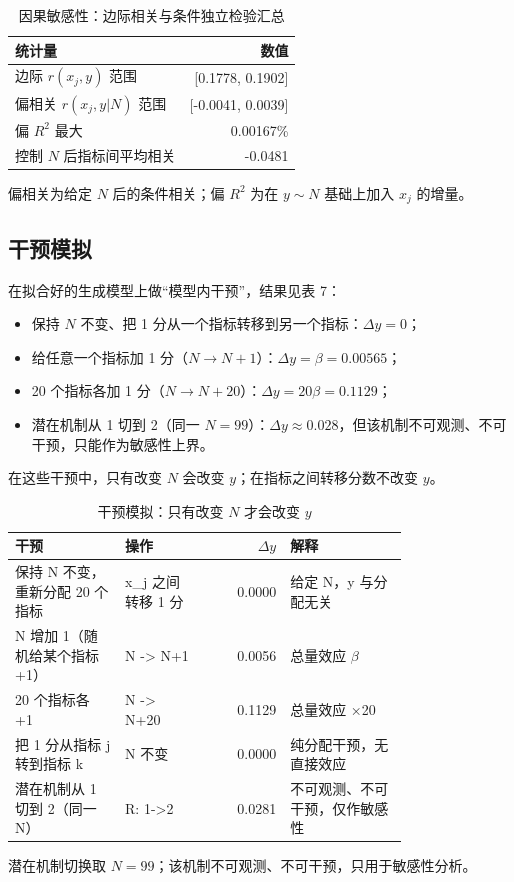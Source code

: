 \documentclass{article}
\begin{document}
\begin{table}[htbp]
\centering
\caption{因果敏感性：边际相关与条件独立检验汇总}
\label{tab:causalsummary}
\small
\begin{tabular}{lr}
\toprule
统计量 & 数值 \\
\midrule
边际 $r(x_j,y)$ 范围 & [0.1778, 0.1902] \\
偏相关 $r(x_j,y|N)$ 范围 & [-0.0041, 0.0039] \\
偏 $R^2$ 最大 & 0.00167\% \\
控制 $N$ 后指标间平均相关 & -0.0481 \\
\bottomrule
\end{tabular}
\par\vspace{2pt}\footnotesize 偏相关为给定 $N$ 后的条件相关；偏 $R^2$ 为在 $y\sim N$ 基础上加入 $x_j$ 的增量。
\end{table}


\subsection{干预模拟}
在拟合好的生成模型上做“模型内干预”，结果见表 7：
\begin{itemize}
  \item 保持 \(N\) 不变、把 1 分从一个指标转移到另一个指标：\(\Delta y=0\)；
  \item 给任意一个指标加 1 分（\(N\to N+1\)）：\(\Delta y=\beta=0.00565\)；
  \item 20 个指标各加 1 分（\(N\to N+20\)）：\(\Delta y=20\beta=0.1129\)；
  \item 潜在机制从 1 切到 2（同一 \(N=99\)）：\(\Delta y\approx0.028\)，但该机制不可观测、不可干预，只能作为敏感性上界。
\end{itemize}
在这些干预中，只有改变 \(N\) 会改变 \(y\)；在指标之间转移分数不改变 \(y\)。

\begin{table}[htbp]
\centering
\caption{干预模拟：只有改变 $N$ 才会改变 $y$}
\label{tab:intervention}
\small
\begin{tabular}{p{0.28\linewidth}p{0.20\linewidth}rp{0.30\linewidth}}
\toprule
干预 & 操作 & $\Delta y$ & 解释 \\
\midrule
保持 N 不变，重新分配 20 个指标 & x\_j 之间转移 1 分 & 0.0000 & 给定 N，y 与分配无关 \\
N 增加 1（随机给某个指标 +1） & N -> N+1 & 0.0056 & 总量效应 $\beta$ \\
20 个指标各 +1 & N -> N+20 & 0.1129 & 总量效应 ×20 \\
把 1 分从指标 j 转到指标 k & N 不变 & 0.0000 & 纯分配干预，无直接效应 \\
潜在机制从 1 切到 2（同一 N） & R: 1->2 & 0.0281 & 不可观测、不可干预，仅作敏感性 \\
\bottomrule
\end{tabular}
\par\vspace{2pt}\footnotesize 潜在机制切换取 $N=99$；该机制不可观测、不可干预，只用于敏感性分析。
\end{table}
\end{document}
